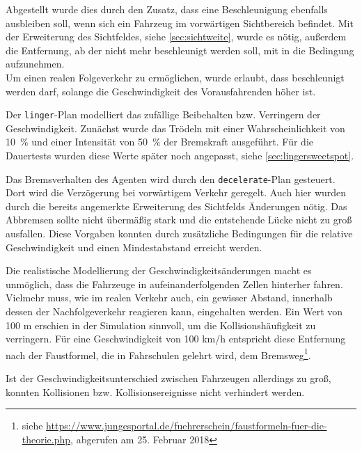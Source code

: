 Abgestellt wurde dies durch den Zusatz, dass eine Beschleunigung ebenfalls ausbleiben soll, wenn sich ein Fahrzeug im vorwärtigen Sichtbereich befindet.
Mit der Erweiterung des Sichtfeldes, siehe \cref{sec:sichtweite}, wurde es nötig, außerdem die Entfernung, ab der nicht mehr beschleunigt werden soll, mit in die Bedingung aufzunehmen.
\\
Um einen realen Folgeverkehr zu ermöglichen, wurde erlaubt, dass beschleunigt werden darf, solange die Geschwindigkeit des Vorausfahrenden höher ist.

Der \texttt{linger}-Plan modelliert das zufällige Beibehalten bzw. Verringern der Geschwindigkeit. 
Zunächst wurde das Trödeln mit einer Wahrscheinlichkeit von \mbox{10 $\%$} und einer Intensität von \mbox{50 $\%$} der Bremskraft ausgeführt.
Für die Dauertests wurden diese Werte später noch angepasst, siehe \cref{sec:lingersweetspot}.

Das Bremsverhalten des Agenten wird durch den \texttt{decelerate}-Plan gesteuert. 
Dort wird die Verzögerung bei vorwärtigem Verkehr geregelt.
Auch hier wurden durch die bereits angemerkte Erweiterung des Sichtfelds Änderungen nötig. 
Das Abbremsen sollte nicht übermäßig stark und die entstehende Lücke nicht zu groß ausfallen. 
Diese Vorgaben konnten durch zusätzliche Bedingungen für die relative Geschwindigkeit und einen Mindestabstand erreicht werden.

Die realistische Modellierung der Geschwindigkeitsänderungen macht es unmöglich, dass die Fahrzeuge in aufeinanderfolgenden Zellen hinterher fahren.
Vielmehr muss, wie im realen Verkehr auch, ein gewisser Abstand, innerhalb dessen der Nachfolgeverkehr reagieren kann, eingehalten werden.
Ein Wert von 100 m erschien in der Simulation sinnvoll, um die Kollisionshäufigkeit zu verringern. 
Für eine Geschwindigkeit von 100 km/h entspricht diese Entfernung nach der Faustformel, die in Fahrschulen gelehrt wird, dem Bremsweg\footnote{siehe \url{https://www.jungesportal.de/fuehrerschein/faustformeln-fuer-die-theorie.php}, abgerufen am 25. Februar 2018}.

Ist der Geschwindigkeitsunterschied zwischen Fahrzeugen allerdings zu groß, konnten Kollisionen bzw. Kollisionsereignisse nicht verhindert werden.

